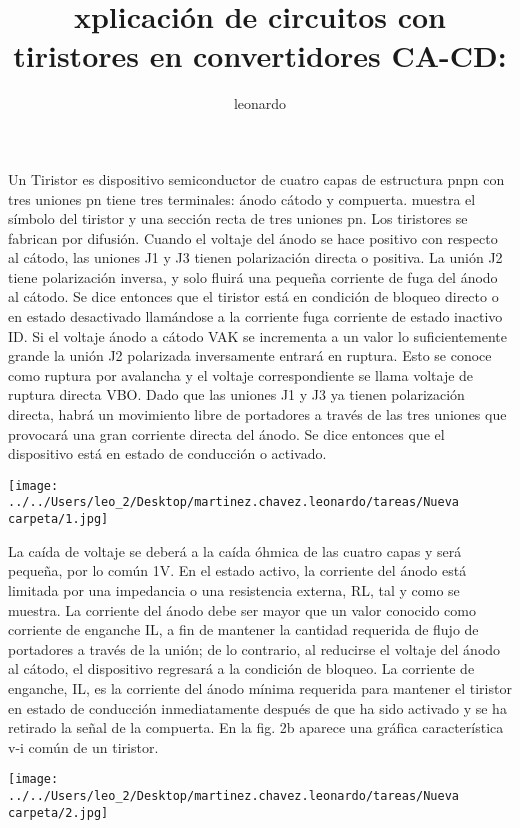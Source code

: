 \documentclass[12pt,a4paper]{article}
\author{leonardo}
\title{xplicación de circuitos con tiristores en convertidores CA-CD:}
\begin{document}
Un Tiristor es dispositivo semiconductor de cuatro capas de estructura pnpn con tres uniones pn tiene tres terminales: ánodo cátodo y compuerta. muestra el símbolo del tiristor y una sección recta de tres uniones pn. Los tiristores se fabrican por difusión.
Cuando el voltaje del ánodo se hace positivo con respecto al cátodo, las uniones J1 y J3 tienen polarización directa o positiva. La unión J2 tiene polarización inversa, y solo fluirá una pequeña corriente de fuga del ánodo al cátodo. Se dice entonces que el tiristor está en condición de bloqueo directo o en estado desactivado llamándose a la corriente fuga corriente de estado inactivo ID. Si el voltaje ánodo a cátodo VAK se incrementa a un valor lo suficientemente grande la unión J2 polarizada inversamente entrará en ruptura. Esto se conoce como ruptura por avalancha y el voltaje correspondiente se llama voltaje de ruptura directa VBO. Dado que las uniones J1 y J3 ya tienen polarización directa, habrá un movimiento libre de portadores a través de las tres uniones que provocará una gran corriente directa del ánodo. Se dice entonces que el dispositivo está en estado de conducción o activado.
\begin{center}
\texttt{[image: ../../Users/leo\_2/Desktop/martinez.chavez.leonardo/tareas/Nueva carpeta/1.jpg]} 
\end{center}
\begin{flushleft}
 La caída de voltaje se deberá a la caída óhmica de las cuatro capas y será pequeña, por lo común 1V. En el estado activo, la corriente del ánodo está limitada por una impedancia o una resistencia externa, RL, tal y como se muestra.
La corriente del ánodo debe ser mayor que un valor conocido como corriente de enganche IL, a fin de mantener la cantidad requerida de flujo de portadores a través de la unión; de lo contrario, al reducirse el voltaje del ánodo al cátodo, el dispositivo regresará a la condición de bloqueo. La corriente de enganche, IL, es la corriente del ánodo mínima requerida para mantener el tiristor en estado de conducción inmediatamente después de que ha sido activado y se ha retirado la señal de la compuerta. En la fig. 2b aparece una gráfica característica v-i común de un tiristor.  

\end{flushleft}
\begin{center}
\texttt{[image: ../../Users/leo\_2/Desktop/martinez.chavez.leonardo/tareas/Nueva carpeta/2.jpg]} 
\end{center}
\end{document}
